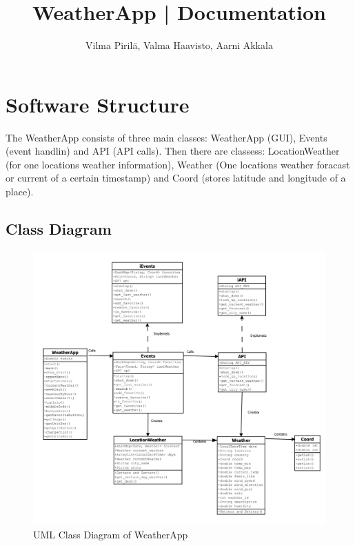 \documentclass[a4paper,10pt]{article}
\begin{document}
\title{WeatherApp | Documentation}
\author{Vilma Pirilä, Valma Haavisto, Aarni Akkala}

\maketitle

\section{Software Structure}

The WeatherApp consists of three main classes: WeatherApp (GUI), Events (event handlin) and API (API calls). Then there are classess: LocationWeather (for one locations weather information), Weather (One locations weather foracast or current of a certain timestamp) and Coord (stores latitude and longitude of a place).

\subsection{Class Diagram}

\begin{figure}[h]
    \centering
    \includegraphics[width=1\textwidth]{class_diagram.pdf}
    \caption{UML Class Diagram of WeatherApp}
    \label{fig:class_diagram}
\end{figure}
\end{document}
